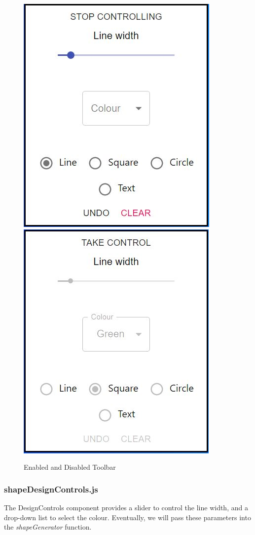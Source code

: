 \begin{figure}[H]
    \centering
    \includegraphics[scale=0.6]{img/SystemDesign/Canvas/inControlToolbar.JPG}
    \includegraphics[scale=0.6]{img/SystemDesign/Canvas/notInControlToolbar.JPG}
    \caption{Enabled and Disabled Toolbar}
\end{figure}

\subsubsection{shapeDesignControls.js}
The DesignControls component provides a slider to control the line width, and a drop-down list to select the colour. Eventually, we will pass these parameters into the \textit{shapeGenerator} function.  

